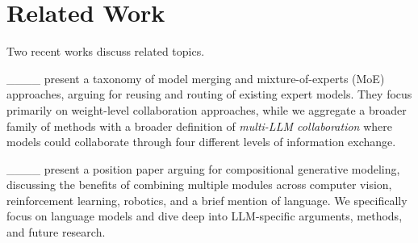 \section{Related Work}
Two recent works discuss related topics. 

____ present a taxonomy of model merging and mixture-of-experts (MoE) approaches, arguing for reusing and routing of existing expert models. They focus primarily on weight-level collaboration approaches, while we aggregate a broader family of methods with a broader definition of \emph{multi-LLM collaboration} where models could collaborate through four different levels of information exchange.

____ present a position paper arguing for compositional generative modeling, discussing the benefits of combining multiple modules across computer vision, reinforcement learning, robotics, and a brief mention of language. We specifically focus on language models and dive deep into LLM-specific arguments, methods, and future research.
